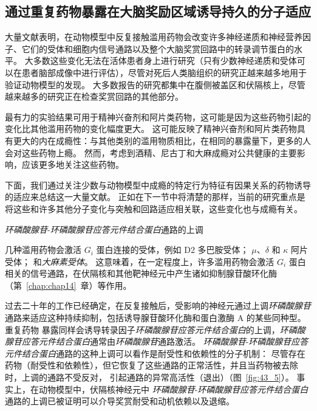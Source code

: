 \subsection{通过重复药物暴露在大脑奖励区域诱导持久的分子适应}

大量文献表明，在动物模型中反复接触滥用药物会改变许多神经递质和神经营养因子、它们的受体和细胞内信号通路以及整个大脑奖赏回路中的转录调节蛋白的水平。
大多数这些变化无法在活体患者身上进行研究（只有少数神经递质和受体可以在患者脑部成像中进行评估），尽管对死后人类脑组织的研究正越来越多地用于验证动物模型的发现。
大多数报告的研究都集中在腹侧被盖区和伏隔核上，尽管越来越多的研究正在检查奖赏回路的其他部分。


最有力的实验结果可用于精神兴奋剂和阿片类药物，这可能是因为这些药物引起的变化比其他滥用药物的变化幅度更大。
这可能反映了精神兴奋剂和阿片类药物具有更大的内在成瘾性：与其他类别的滥用物质相比，在相同的暴露量下，更多的人会对这些药物上瘾。
然而，考虑到酒精、尼古丁和大麻成瘾对公共健康的主要影响，应该更多地关注这些药物。


下面，我们通过关注少数与动物模型中成瘾的特定行为特征有因果关系的药物诱导的适应来总结这一大量文献。
正如在下一节中将清楚的那样，当前的研究重点是将这些和许多其他分子变化与突触和回路适应相关联，这些变化也与成瘾有关。


\textit{环磷酸腺苷}-\textit{环磷酸腺苷应答元件结合蛋白}通路的上调

几种滥用药物会激活 $ G_i $ 蛋白连接的受体，例如 D2 多巴胺受体；
$ \mu $、$ \delta $ 和 $ \kappa $ 阿片受体；
和\textit{大麻素受体}。
这意味着，在一定程度上，许多滥用药物会激活 $ G_i $ 蛋白相关的信号通路，在伏隔核和其他靶神经元中产生诸如抑制腺苷酸环化酶（第~\ref{chap:chap14}~章）等作用。


过去二十年的工作已经确定，在反复接触后，受影响的神经元通过上调\textit{环磷酸腺苷}通路来适应这种持续抑制，包括诱导腺苷酸环化酶和蛋白激酶 A 的某些同种型。
重复药物 暴露同样会诱导转录因子\textit{环磷酸腺苷应答元件结合蛋白}的上调，\textit{环磷酸腺苷应答元件结合蛋白}通常由\textit{环磷酸腺苷}通路激活。
\textit{环磷酸腺苷}-\textit{环磷酸腺苷应答元件结合蛋白}通路的这种上调可以看作是耐受性和依赖性的分子机制：
尽管存在药物（耐受性和依赖性），但它恢复了这些通路的正常活性，并且当药物被去除时，上调的通路不受反对， 引起通路的异常高活性（退出）（图~\ref{fig:43_5}）。
事实上，在动物模型中，伏隔核神经元中 \textit{环磷酸腺苷}-\textit{环磷酸腺苷应答元件结合蛋白}通路的上调已被证明可以介导奖赏耐受和动机依赖以及退缩。


